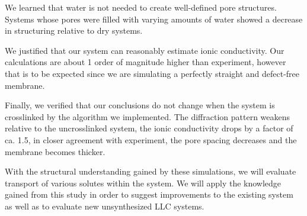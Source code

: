 \documentclass{article}
\begin{document}
  We learned that water is not needed to create well-defined pore structures.
  Systems whose pores were filled with varying amounts of water showed a decrease
  in structuring relative to dry systems. 

  We justified that our system can reasonably estimate ionic conductivity.  Our
  calculations are about 1 order of magnitude higher than experiment, however
  that is to be expected since we are simulating a perfectly straight and
  defect-free membrane. 

  Finally, we verified that our conclusions do not change when the system is
  crosslinked by the algorithm we implemented. The diffraction pattern weakens
  relative to the uncrosslinked system, the ionic conductivity drops by a factor
  of ca. 1.5, in closer agreement with experiment, the pore spacing decreases and
  the membrane becomes thicker. 

  With the structural understanding gained by these simulations, we will
  evaluate transport of various solutes within the system. We will apply the
  knowledge gained from this study in order to suggest improvements to the
  existing system as well as to evaluate new unsynthesized LLC systems.

  \clearpage
  
\end{document}
